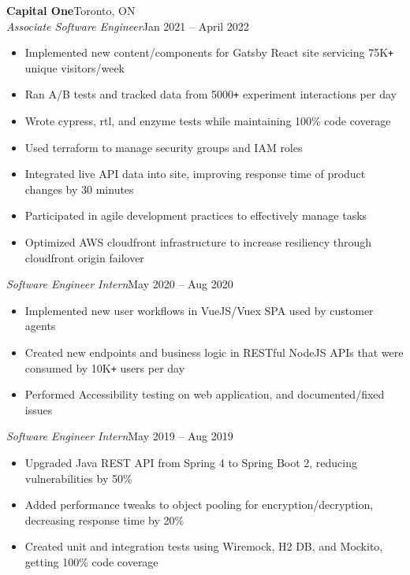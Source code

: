 \documentclass[letterpaper]{article}
\newcommand{\JobEntry}[3]{
	\normalsize\textbf{#1}\hfill\normalsize{#2}\\
	#3\vspace{0.1cm}
}
\newcommand{\DatedEntry}[3]{
	\small\textit{#1}\hfill\small{#2}\\
	\vspace{0.1cm}#3\vspace{0.1cm}
}
\begin{document}
\JobEntry{Capital One}{Toronto, ON}
{
	\DatedEntry{Associate Software Engineer}
		{Jan 2021 -- April 2022}
		{
			\begin{itemize}[nolistsep]
				\item Implemented new content/components for Gatsby React site servicing 75K\texttt{+} unique visitors/week
				\item Ran A/B tests and tracked data from 5000\texttt{+} experiment interactions per day
				\item Wrote cypress, rtl, and enzyme tests while maintaining 100\% code coverage
				\item Used terraform to manage security groups and IAM roles
				\item Integrated live API data into site, improving response time of product changes by 30 minutes
				\item Participated in agile development practices to effectively manage tasks 
				\item Optimized AWS cloudfront infrastructure to increase resiliency through cloudfront origin failover
			\end{itemize}
	}
	\DatedEntry{Software Engineer Intern}
		{May 2020 -- Aug 2020}
		{
			\begin{itemize}[nolistsep]
				\item Implemented new user workflows in VueJS/Vuex SPA used by customer agents
				\item Created new endpoints and business logic in RESTful NodeJS APIs that were consumed by 10K\texttt{+} users per day
				\item Performed Accessibility testing on web application, and documented/fixed issues
			\end{itemize}
		}
	\DatedEntry{Software Engineer Intern}
		{May 2019 -- Aug 2019}
		{
			\begin{itemize}[nolistsep]
				\item Upgraded Java REST API from Spring 4 to Spring Boot 2, reducing vulnerabilities by 50\%
				\item Added performance tweaks to object pooling for encryption/decryption, decreasing response time by 20\%
				\item Created unit and integration tests using Wiremock, H2 DB, and Mockito, getting 100\% code coverage
			\end{itemize}
		}
}
\vspace{-0.3cm}
\end{document}
